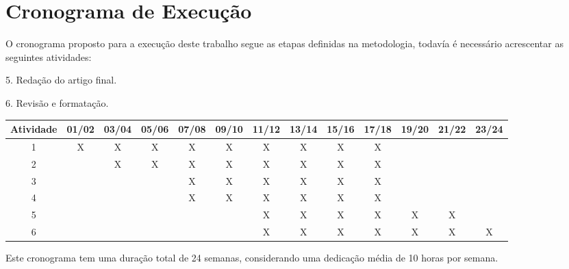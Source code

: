 \section{Cronograma de Execução}
O cronograma proposto para a execução deste trabalho segue as etapas definidas na metodologia, todavía é necessário acrescentar as seguintes atividades:

        5. Redação do artigo final.  
        
        6. Revisão e formatação.
        
\begin{center}
\begin{tabular}{||c c c c c c c c c c c c c||} 
 \hline
Atividade & 01/02 & 03/04 & 05/06 & 07/08 & 09/10 & 11/12 & 13/14 & 15/16 & 17/18 & 19/20 & 21/22 & 23/24\\ [0.5ex] 
 \hline\hline
 1 & X & X & X & X & X & X & X & X & X & & & \\ 
 \hline
 2 & & X & X & X & X & X & X & X & X & & & \\
 \hline
 3 & & & & X & X & X & X & X & X & & & \\
 \hline
 4 & & & & X & X & X & X & X & X & & & \\
 \hline
 5 & & & & & & X & X & X & X & X & X & \\
 \hline
 6 & & & & & & X & X & X & X & X & X & X \\
 \hline
\end{tabular}
\end{center}

Este cronograma tem uma duração total de 24 semanas, considerando uma dedicação média de 10 horas por semana.